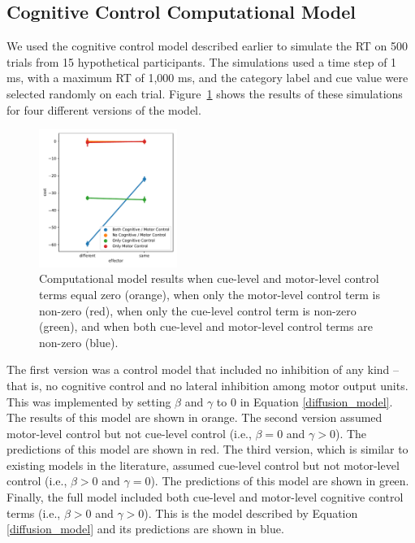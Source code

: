 \documentclass[doc, floatsintext]{apa7}
\begin{document}
\subsection{Cognitive Control Computational Model}
We used the cognitive control model described earlier to
simulate the RT on 500 trials from 15 hypothetical
participants. The simulations used a time step of 1 ms, with
a maximum RT of 1,000 ms, and the category label and cue
value were selected randomly on each trial.
Figure~\ref{fig_8} shows the results of these simulations
for four different versions of the model.

\begin{figure}[h!]
    \centering
    \includegraphics[width=0.4\textwidth]{../figures/fig_8.pdf}
    \caption{
        Computational model results when cue-level and
        motor-level control terms equal zero (orange), when
        only the motor-level control term is non-zero (red),
        when only the cue-level control term is non-zero
        (green), and when both cue-level and motor-level
        control terms are non-zero (blue).
    }
    \label{fig_8}
\end{figure}

The first version was a control model that included no
inhibition of any kind -- that is, no cognitive control and
no lateral inhibition among motor output units. This was
implemented by setting $\beta$ and $\gamma$ to 0 in Equation
\ref{diffusion_model}. The results of this model are shown
in orange.  The second version assumed motor-level control
but not cue-level control (i.e., $\beta=0$ and $\gamma>0$).
The predictions of this model are shown in red. The third
version, which is similar to existing models in the
literature, assumed cue-level control but not motor-level
control (i.e., $\beta>0$ and $\gamma=0$).  The predictions
of this model are shown in green.   Finally, the full model
included both cue-level and motor-level cognitive control
terms (i.e., $\beta>0$ and $\gamma>0$). This is the model
described by Equation \ref{diffusion_model} and its
predictions are shown in blue.
\end{document}
